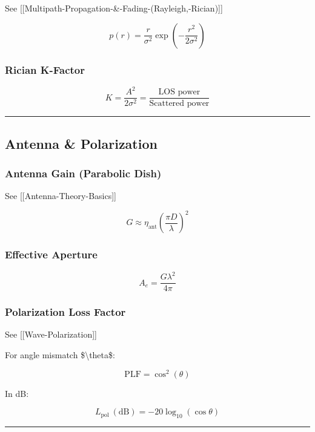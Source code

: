 See {[}{[}Multipath-Propagation-\&-Fading-(Rayleigh,-Rician){]}{]}

\[
p(r) = \frac{r}{\sigma^2} \exp\left(-\frac{r^2}{2\sigma^2}\right)
\]

\subsubsection{Rician K-Factor}\label{rician-k-factor}

\[
K = \frac{A^2}{2\sigma^2} = \frac{\text{LOS power}}{\text{Scattered power}}
\]

\begin{center}\rule{0.5\linewidth}{0.5pt}\end{center}

\subsection{\texorpdfstring{ Antenna \&
Polarization}{ Antenna \& Polarization}}\label{antenna-polarization}

\subsubsection{Antenna Gain (Parabolic
Dish)}\label{antenna-gain-parabolic-dish}

See {[}{[}Antenna-Theory-Basics{]}{]}

\[
G \approx \eta_{\text{ant}} \left(\frac{\pi D}{\lambda}\right)^2
\]

\subsubsection{Effective Aperture}\label{effective-aperture}

\[
A_e = \frac{G\lambda^2}{4\pi}
\]

\subsubsection{Polarization Loss Factor}\label{polarization-loss-factor}

See {[}{[}Wave-Polarization{]}{]}

For angle mismatch \$\textbackslash theta\$:

\[
\text{PLF} = \cos^2(\theta)
\]

In dB:

\[
L_{\text{pol}}\ (\text{dB}) = -20\log_{10}(\cos\theta)
\]

\begin{center}\rule{0.5\linewidth}{0.5pt}\end{center}

